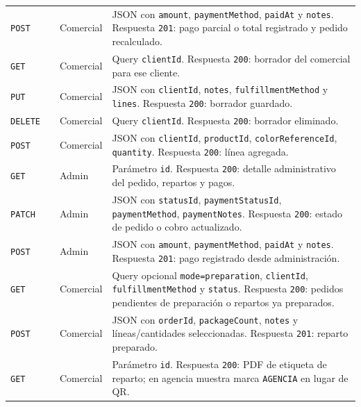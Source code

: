 {\begin{longtable}{A{0.10\textwidth}A{0.27\textwidth}A{0.15\textwidth}A{0.38\textwidth}}
\texttt{POST} &  & Comercial & JSON con \texttt{amount}, \texttt{paymentMethod}, \texttt{paidAt} y \texttt{notes}. Respuesta \texttt{201}: pago parcial o total registrado y pedido recalculado.\\
\texttt{GET} &  & Comercial & Query \texttt{clientId}. Respuesta \texttt{200}: borrador del comercial para ese cliente.\\
\texttt{PUT} &  & Comercial & JSON con \texttt{clientId}, \texttt{notes}, \texttt{fulfillmentMethod} y \texttt{lines}. Respuesta \texttt{200}: borrador guardado.\\
\texttt{DELETE} &  & Comercial & Query \texttt{clientId}. Respuesta \texttt{200}: borrador eliminado.\\
\texttt{POST} &  & Comercial & JSON con \texttt{clientId}, \texttt{productId}, \texttt{colorReferenceId}, \texttt{quantity}. Respuesta \texttt{200}: línea agregada.\\
\texttt{GET} &  & Admin & Parámetro \texttt{id}. Respuesta \texttt{200}: detalle administrativo del pedido, repartos y pagos.\\
\texttt{PATCH} &  & Admin & JSON con \texttt{statusId}, \texttt{paymentStatusId}, \texttt{paymentMethod}, \texttt{paymentNotes}. Respuesta \texttt{200}: estado de pedido o cobro actualizado.\\
\texttt{POST} &  & Admin & JSON con \texttt{amount}, \texttt{paymentMethod}, \texttt{paidAt} y \texttt{notes}. Respuesta \texttt{201}: pago registrado desde administración.\\
\texttt{GET} &  & Comercial & Query opcional \texttt{mode=preparation}, \texttt{clientId}, \texttt{fulfillmentMethod} y \texttt{status}. Respuesta \texttt{200}: pedidos pendientes de preparación o repartos ya preparados.\\
\texttt{POST} &  & Comercial & JSON con \texttt{orderId}, \texttt{packageCount}, \texttt{notes} y líneas/cantidades seleccionadas. Respuesta \texttt{201}: reparto preparado.\\
\texttt{GET} &  & Comercial & Parámetro \texttt{id}. Respuesta \texttt{200}: PDF de etiqueta de reparto; en agencia muestra marca \texttt{AGENCIA} en lugar de QR.\\
\end{longtable}
}

